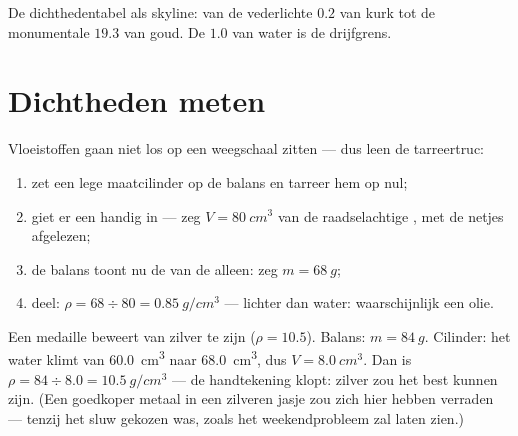 \begin{omfigure}

{\small De dichthedentabel als skyline: van de vederlichte $0.2$ van
kurk tot de monumentale $19.3$ van goud. De $1.0$ van water is de
drijfgrens.}
\end{omfigure}

\section{Dichtheden meten}

\begin{method}\label{met:g7:volume-mass-density:liquid}
Vloeistoffen gaan niet los op een weegschaal zitten --- dus leen de
tarreertruc:
\begin{enumerate}
  \item zet een lege maatcilinder op de balans en tarreer hem op nul;
  \item giet er een handig  in --- zeg $V = \qty{80}{cm^3}$
        van de raadselachtige , met de  netjes
        afgelezen;
  \item de balans toont nu de  van de  alleen: zeg
        $m = \qty{68}{g}$;
  \item deel: $\rho = 68 \div 80 = \qty{0.85}{g/cm^3}$ --- lichter
        dan water: waarschijnlijk een olie.
\end{enumerate}
\end{method}

\begin{example}\label{ex:g7:volume-mass-density:solid}
Een medaille beweert van zilver te zijn ($\rho = 10.5$). Balans:
$m = \qty{84}{g}$. Cilinder: het water klimt van \qty{60.0}{cm^3} naar
\qty{68.0}{cm^3}, dus $V = \qty{8.0}{cm^3}$. Dan is
$\rho = 84 \div 8.0 = \qty{10.5}{g/cm^3}$ --- de handtekening klopt:
zilver zou het best kunnen zijn. (Een goedkoper metaal in een zilveren
jasje zou zich hier hebben verraden --- tenzij het sluw gekozen was,
zoals het weekendprobleem zal laten zien.)
\end{example}

